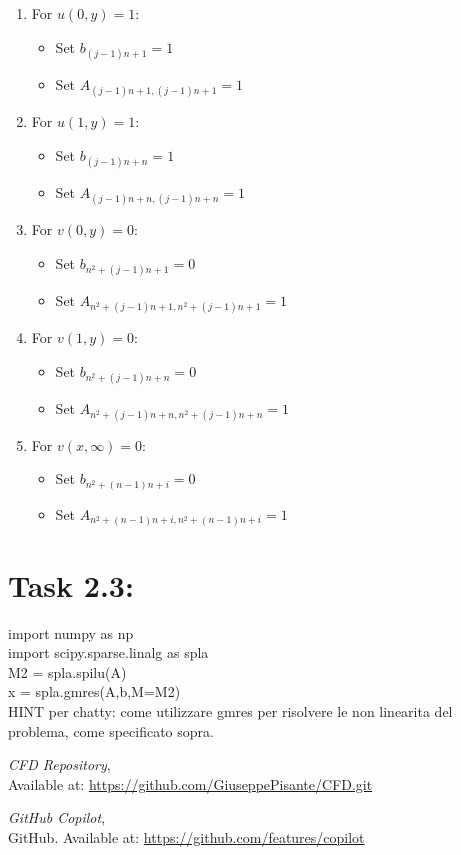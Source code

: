 \documentclass{article}
\begin{document}
\begin{enumerate}
  \item For \( u(0,y) = 1 \):
  \begin{itemize}
    \item Set \( b_{(j-1)n+1} = 1 \)
    \item Set \( A_{(j-1)n+1, (j-1)n+1} = 1 \)
  \end{itemize}
  
  \item For \( u(1,y) = 1 \):
  \begin{itemize}
    \item Set \( b_{(j-1)n+n} = 1 \)
    \item Set \( A_{(j-1)n+n, (j-1)n+n} = 1 \) 
  \end{itemize}
  
  \item For \( v(0,y) = 0 \):
  \begin{itemize}
    \item Set \( b_{n^2+(j-1)n+1} = 0 \)
    \item Set \( A_{n^2+(j-1)n+1, n^2+(j-1)n+1} = 1 \)
  \end{itemize}
  
  
   \item For \( v(1,y) = 0 \):
    \begin{itemize}
      \item Set \( b_{n^2+(j-1)n+n} = 0 \)
      \item Set \( A_{n^2+(j-1)n+n, n^2+(j-1)n+n} = 1 \)
    \end{itemize}
  
  \item For \( v(x,\infty) = 0 \):
  \begin{itemize}
    \item Set \( b_{n^2+(n-1)n+i} = 0 \)
    \item Set \( A_{n^2+(n-1)n+i, n^2+(n-1)n+i} = 1 \) 
  \end{itemize}
\end{enumerate}

\section*{\Large Task 2.3:}
import numpy as np \\
import scipy.sparse.linalg as spla \\
M2 = spla.spilu(A)  \\
x = spla.gmres(A,b,M=M2)  \\

HINT per chatty: come utilizzare gmres per risolvere le non linearita del problema, come specificato sopra.

\begin{thebibliography}{9}
    \textit{CFD Repository},\\
    Available at: \url{https://github.com/GiuseppePisante/CFD.git}
    
    \textit{GitHub Copilot},\\
    GitHub. Available at: \url{https://github.com/features/copilot}
    \end{thebibliography}
\end{document}
